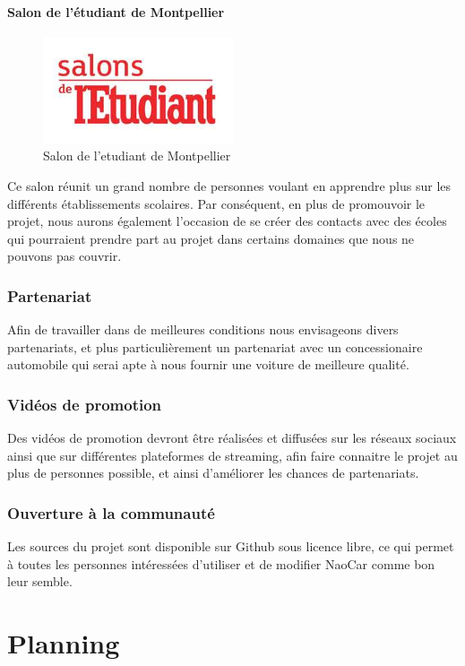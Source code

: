\documentclass[11pt]{report} %
\begin{document}
	                \subsubsection{Salon de l'étudiant de Montpellier}
				\begin{figure}[htb]
				\centering
				\includegraphics[width=0.5\textwidth]{salon-de-l-enseignement-superieur-de-montpellier.jpg}
				\caption{Salon de l'etudiant de Montpellier}
				\label{fig:Salon de l'etudiant de Montpellier}
				\end{figure}
				Ce salon réunit un grand nombre de personnes voulant en apprendre plus sur les différents établissements scolaires. Par conséquent, en plus de promouvoir le projet, nous aurons également l'occasion de se créer des contacts avec des écoles qui pourraient prendre part au projet dans certains domaines que nous ne pouvons pas couvrir.
		\subsection{Partenariat}
			Afin de travailler dans de meilleures conditions nous envisageons divers partenariats, et plus particulièrement un partenariat avec un concessionaire automobile qui serai apte à nous fournir une voiture de meilleure qualité.
		\subsection{Vidéos de promotion}
			Des vidéos de promotion devront être réalisées et diffusées sur les réseaux sociaux ainsi que sur différentes plateformes de streaming, afin faire connaitre le projet au plus de personnes possible, et ainsi d'améliorer les chances de partenariats.
		\subsection{Ouverture à la communauté}
			Les sources du projet sont disponible sur Github sous licence libre, ce qui permet à toutes les personnes intéressées d'utiliser et de modifier NaoCar comme bon leur semble.
\chapter{Planning}
\end{document}
